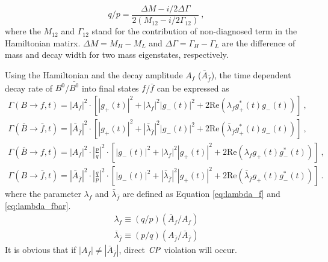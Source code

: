 \begin{equation}\label{eq:qp}
q/p = \frac{\Delta M - i/2 \Delta \Gamma}{2(M_{12}- i/2 \Gamma_{12})}~,
\end{equation}
where the $M_{12}$ and $\Gamma_{12}$ stand for the contribution of non-diagnosed term in the Hamiltonian matirx. $\Delta{M}=M_H-M_L$ and $\Delta{\Gamma}=\Gamma_H-\Gamma_L$ are the difference of mass and decay width for two mass eigenstates, respectively.
\begin{comment}
Considering all the phase-spaces of the decay from flavor eigenstates to final states $f(\bar{f})$ are included in the amplitudes $\mathcal{A}_f (\bar{\mathcal{A}}_f)$, one needs to expand the flavor eigenstates using the final states amplitudes to have the differential decay rate $\Gamma(B\to f,t)$. From $B(t) \propto \mathcal{A}_f\psi_f+h.c $ and $ (\bar{B}(t) \propto \bar{\mathcal{A}_f}\psi_{\bar{f}}+h.c)$, combined with Equation \ref{eq:Bt_new} and \ref{eq:Bbart_new},
\end{comment}
Using the Hamiltonian and the decay amplitude $A_f$ ($\bar{A}_{\bar{f}}$), the time dependent decay rate of $B^0$/$\bar{B^0}$ into final states $f$/$\bar{f}$ can be expressed as
\begin{eqnarray}
\Gamma(B\to f,t)=|{A}_f|^2\cdot[|g_+(t)|^2+|\lambda_f|^2|g_-(t)|^2+2\text{Re}(\lambda_f g^*_+(t)g_-(t))] \label{eq:gamma_B}~,\\
\Gamma(\bar{B}\to \bar{f},t)=|{\bar{{A}}_{\bar{f}}}|^2\cdot [|g_+(t)|^2+|\bar{\lambda}_{\bar{f}}|^2|g_-(t)|^2+2\text{Re}(\bar{\lambda}_{\bar{f}} g^*_+(t)g_-(t))]~,\\
\Gamma(\bar{B}\to f,t)=|{A}_f|^2 \cdot|\frac{p}{q}|^2 \cdot[|g_-(t)|^2+|\lambda_f|^2|g_+(t)|^2+2\text{Re}(\lambda_f g_+(t)g^*_-(t))]~, \\
\Gamma({B}\to \bar{f},t)=|{\bar{{A}}_{\bar{f}}}|^2 \cdot|\frac{q}{p}|^2\cdot [|g_-(t)|^2+|\bar{\lambda}_{\bar{f}}|^2|g_+(t)|^2+2\text{Re}(\bar{\lambda}_{\bar{f}} g_+(t)g^*_-(t))]~.
\label{eq:gamma_Bbar}
\end{eqnarray} where the parameter $\lambda_f$ and $\bar{\lambda}_{\bar{f}}$ are defined as Equation \ref{eq:lambda_f} and \ref{eq:lambda_fbar}.
\begin{eqnarray}
\lambda_f \equiv (q/p) (\bar{{A}}_f / {A}_f) \label{eq:lambda_f}\\
\bar{\lambda}_{\bar{f}} \equiv (p/q) ( {A}_{\bar{f}}/\bar{{A}}_{\bar{f}}) \label{eq:lambda_fbar}
\end{eqnarray} 
It is obvious that if $|A_f| \neq |\bar{A}_{\bar{f}}|$, direct $\it{CP}$ violation will occur.  
